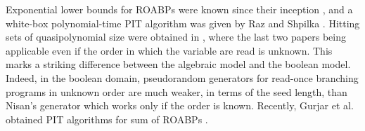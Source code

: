 \documentclass[11pt]{article}
\begin{document}
%
%
%



Exponential lower bounds for ROABPs were known since their inception \cite{nis91}, and a white-box polynomial-time PIT algorithm was given by Raz and Shpilka \cite{RS05}. Hitting sets of quasipolynomial size were obtained in \cite{FS13, FSS14, agks15}, where the last two papers being applicable even if the order in which the variable are read is unknown. This marks a striking difference between the algebraic model and the boolean model. Indeed, in the boolean domain, pseudorandom generators for read-once branching programs in unknown order are much weaker, in terms of the seed length, than Nisan's generator \cite{Nisan92} which works only if the order is known. Recently, Gurjar et al. obtained PIT algorithms for sum of ROABPs \cite{GKST15}.

\end{document}

